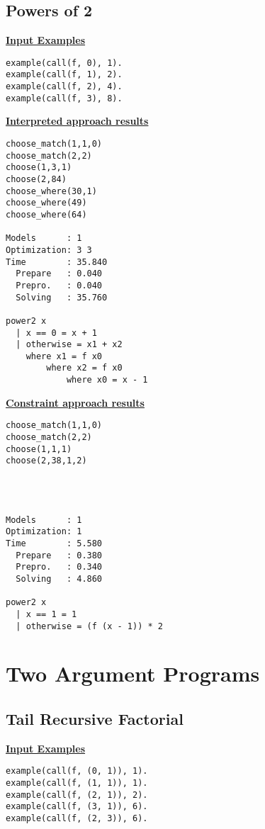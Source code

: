\pagebreak
\subsection{Powers of 2}
\underline{\textbf{Input Examples}}
\begin{lstlisting}
example(call(f, 0), 1).
example(call(f, 1), 2).
example(call(f, 2), 4).
example(call(f, 3), 8).
\end{lstlisting}

\begin{multicols*}{2}
\underline{\textbf{Interpreted approach results}}
\begin{lstlisting}
choose_match(1,1,0) 
choose_match(2,2) 
choose(1,3,1) 
choose(2,84) 
choose_where(30,1) 
choose_where(49) 
choose_where(64) 

Models      : 1     
Optimization: 3 3 
Time        : 35.840
  Prepare   : 0.040
  Prepro.   : 0.040
  Solving   : 35.760

power2 x
  | x == 0 = x + 1
  | otherwise = x1 + x2
  	where x1 = f x0
  		where x2 = f x0
  			where x0 = x - 1
\end{lstlisting}
\vfill
\columnbreak
\underline{\textbf{Constraint approach results}}
\begin{lstlisting}
choose_match(1,1,0) 
choose_match(2,2)
choose(1,1,1)
choose(2,38,1,2) 
 
 
 
 
Models      : 1  
Optimization: 1 
Time        : 5.580
  Prepare   : 0.380
  Prepro.   : 0.340
  Solving   : 4.860

power2 x
  | x == 1 = 1
  | otherwise = (f (x - 1)) * 2 
\end{lstlisting}
\end{multicols*}
\pagebreak
\section{Two Argument Programs}

\subsection{Tail Recursive Factorial}
\underline{\textbf{Input Examples}}
\begin{lstlisting}
example(call(f, (0, 1)), 1).
example(call(f, (1, 1)), 1).
example(call(f, (2, 1)), 2).
example(call(f, (3, 1)), 6).
example(call(f, (2, 3)), 6).
\end{lstlisting}

